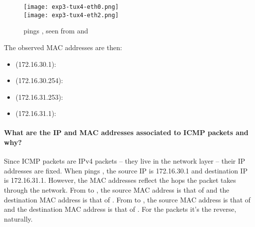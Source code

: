 \documentclass[compilation.tex]{subfiles}
\begin{document}
\begin{figure}[hbt]
\centering
\texttt{[image: exp3-tux4-eth0.png]}\\
\vspace*{.8\baselineskip}
\texttt{[image: exp3-tux4-eth2.png]}
\caption{ pings , seen from  and }
\label{fig:exp3-tux4.png}
\end{figure}

The observed MAC addresses are then:
\begin{itemize}[noitemsep,leftmargin=*,topsep=0pt]
\item {} (172.16.30.1): 
\item {} (172.16.30.254): 
\item {} (172.16.31.253): 
\item {} (172.16.31.1): 
\end{itemize}

\paragraph{What are the IP and MAC addresses associated to ICMP packets and why?}
Since ICMP packets are IPv4 packets -- they live in the network layer -- their IP addresses are fixed.
When  pings , the source IP is 172.16.30.1 and destination IP is 172.16.31.1.
However, the MAC addresses reflect the hops the packet takes through the network.
From  to , the source MAC address is that of  and the destination MAC address is that of .
From  to , the source MAC address is that of  and the destination MAC address is that of .
For the  packets it's the reverse, naturally.
\end{document}
